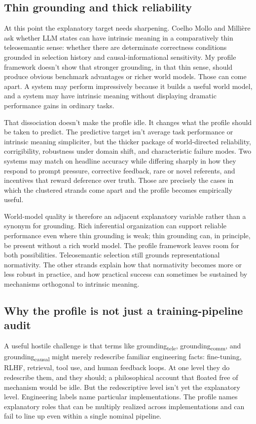 \documentclass[12pt]{article}
\newcommand{\gtele}{grounding\textsubscript{tele}}
\newcommand{\gcausal}{grounding\textsubscript{causal}}
\newcommand{\gcomm}{grounding\textsubscript{comm}}
\begin{document}
\subsection{Thin grounding and thick reliability}
\label{sec:thin-thick}

At this point the explanatory target needs sharpening. Coelho Mollo and Milli\`ere ask whether LLM states can have intrinsic meaning in a comparatively thin teleosemantic sense: whether there are determinate correctness conditions grounded in selection history and causal-informational sensitivity. My profile framework doesn't show that stronger grounding, in that thin sense, should produce obvious benchmark advantages or richer world models. Those can come apart. A system may perform impressively because it builds a useful world model, and a system may have intrinsic meaning without displaying dramatic performance gains in ordinary tasks.

That dissociation doesn't make the profile idle. It changes what the profile should be taken to predict. The predictive target isn't average task performance or intrinsic meaning simpliciter, but the thicker package of world-directed reliability, corrigibility, robustness under domain shift, and characteristic failure modes. Two systems may match on headline accuracy while differing sharply in how they respond to prompt pressure, corrective feedback, rare or novel referents, and incentives that reward deference over truth. Those are precisely the cases in which the clustered strands come apart and the profile becomes empirically useful.

World-model quality is therefore an adjacent explanatory variable rather than a synonym for grounding. Rich inferential organization can support reliable performance even where thin grounding is weak; thin grounding can, in principle, be present without a rich world model. The profile framework leaves room for both possibilities. Teleosemantic selection still grounds representational normativity. The other strands explain how that normativity becomes more or less robust in practice, and how practical success can sometimes be sustained by mechanisms orthogonal to intrinsic meaning.

\subsection{Why the profile is not just a training-pipeline audit}
\label{sec:not-just-pipeline}

A useful hostile challenge is that terms like \gtele{}, \gcomm{}, and \gcausal{} might merely redescribe familiar engineering facts: fine-tuning, RLHF, retrieval, tool use, and human feedback loops. At one level they do redescribe them, and they should; a philosophical account that floated free of mechanism would be idle. But the redescriptive level isn't yet the explanatory level. Engineering labels name particular implementations. The profile names explanatory roles that can be multiply realized across implementations and can fail to line up even within a single nominal pipeline.
\end{document}
